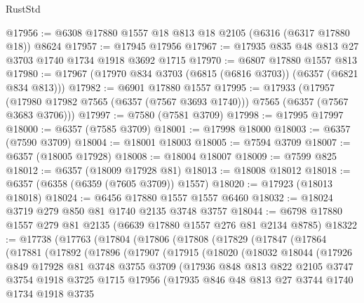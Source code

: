 \begin{lexlean}{RustStd}
\begin{coremodule}
@17956 := @6308 @17880 @1557 @18 @813 @18 @2105 (@6316 (@6317 @17880 @18)) @8624
@17957 := @17945 @17956
@17967 := @17935 @835 @48 @813 @27 @3703 @1740 @1734 @1918 @3692 @1715
@17970 := @6807 @17880 @1557 @813
@17980 := @17967 (@17970 @834 @3703 (@6815 (@6816 @3703)) (@6357 (@6821 @834 @813)))
@17982 := @6901 @17880 @1557
@17995 := @17933
    (@17957 (@17980 @17982 @7565 (@6357 (@7567 @3693 @1740))) @7565 (@6357 (@7567 @3683 @3706)))
@17997 := @7580 (@7581 @3709)
@17998 := @17995 @17997
@18000 := @6357 (@7585 @3709)
@18001 := @17998 @18000
@18003 := @6357 (@7590 @3709)
@18004 := @18001 @18003
@18005 := @7594 @3709
@18007 := @6357 (@18005 @17928)
@18008 := @18004 @18007
@18009 := @7599 @825
@18012 := @6357 (@18009 @17928 @81)
@18013 := @18008 @18012
@18018 := @6357 (@6358 (@6359 (@7605 @3709)) @1557)
@18020 := @17923 (@18013 @18018)
@18024 := @6456 @17880 @1557 @1557 @6460
@18032 := @18024 @3719 @279 @850 @81 @1740 @2135 @3748 @3757
@18044 := @6798 @17880 @1557 @279 @81 @2135 (@6639 @17880 @1557 @276 @81 @2134 @8785)
@18322 := @17738
    (@17763
      (@17804
        (@17806
          (@17808
            (@17829
              (@17847
                (@17864
                  (@17881
                    (@17892
                      (@17896
                        (@17907
                          (@17915
                            (@18020
                              (@18032
                                @18044
                                (@17926
                                  @849
                                  @17928
                                  @81
                                  @3748
                                  @3755
                                  @3709
                                  (@17936
                                    @848
                                    @813
                                    @822
                                    @2105
                                    @3747
                                    @3754
                                    @1918
                                    @3725
                                    @1715
                                    @17956
                                    (@17935
                                      @846
                                      @48
                                      @813
                                      @27
                                      @3744
                                      @1740
                                      @1734
                                      @1918
                                      @3735

\end{coremodule}
\end{lexlean}
